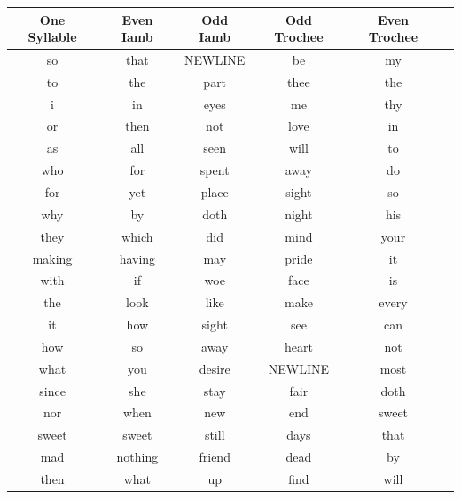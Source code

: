\begin{itemize}
\begin{tabular}{|c|c|c|c|c|c|}
    \hline
    One Syllable & Even Iamb & Odd Iamb & Odd Trochee & Even Trochee \\
    \hline
    so & that & NEWLINE & be & my \\
    to & the & part & thee & the \\
    i & in & eyes & me & thy \\
    or & then & not & love & in \\
    as & all & seen & will & to \\
    who & for & spent & away & do \\
    for & yet & place & sight & so \\
    why & by & doth & night & his \\
    they & which & did & mind & your \\
    making & having & may & pride & it \\
    with & if & woe & face & is \\
    the & look & like & make & every \\
    it & how & sight & see & can \\
    how & so & away & heart & not \\
    what & you & desire & NEWLINE & most \\
    since & she & stay & fair & doth \\
    nor & when & new & end & sweet \\
    sweet & sweet & still & days & that \\
    mad & nothing & friend & dead & by \\
    then & what & up & find & will \\
    \hline
\end{tabular}


\end{itemize}


